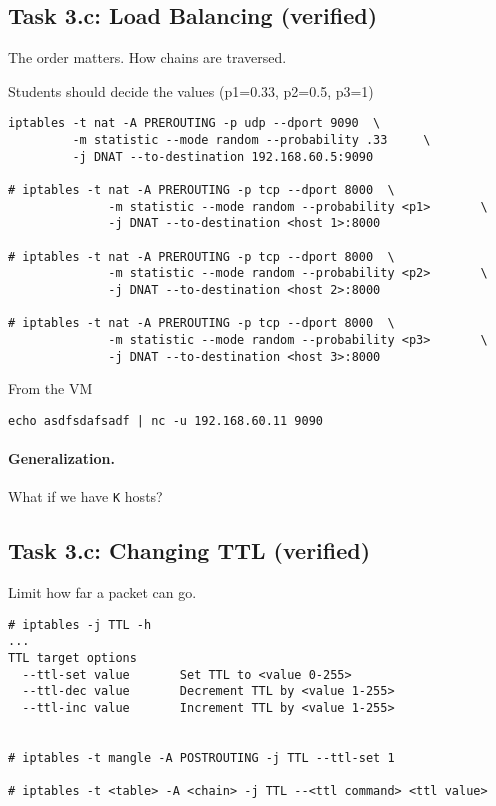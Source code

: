\subsection{Task 3.c: Load Balancing (verified)}

The order matters. How chains are traversed. 
 


Students should decide the values (p1=0.33, p2=0.5, p3=1)

\begin{lstlisting}
iptables -t nat -A PREROUTING -p udp --dport 9090  \
         -m statistic --mode random --probability .33     \
         -j DNAT --to-destination 192.168.60.5:9090

# iptables -t nat -A PREROUTING -p tcp --dport 8000  \
              -m statistic --mode random --probability <p1>       \
              -j DNAT --to-destination <host 1>:8000

# iptables -t nat -A PREROUTING -p tcp --dport 8000  \
              -m statistic --mode random --probability <p2>       \
              -j DNAT --to-destination <host 2>:8000

# iptables -t nat -A PREROUTING -p tcp --dport 8000  \
              -m statistic --mode random --probability <p3>       \
              -j DNAT --to-destination <host 3>:8000
\end{lstlisting}



From the VM  
\begin{lstlisting}
echo asdfsdafsadf | nc -u 192.168.60.11 9090
\end{lstlisting}
 

\paragraph{Generalization.} What if we have \texttt{K} hosts?  


 

\subsection{Task 3.c: Changing TTL (verified)}



Limit how far a packet can go. 


\begin{lstlisting}
# iptables -j TTL -h
...
TTL target options
  --ttl-set value		Set TTL to <value 0-255>
  --ttl-dec value		Decrement TTL by <value 1-255>
  --ttl-inc value		Increment TTL by <value 1-255>


# iptables -t mangle -A POSTROUTING -j TTL --ttl-set 1

# iptables -t <table> -A <chain> -j TTL --<ttl command> <ttl value>

\end{lstlisting}
 




